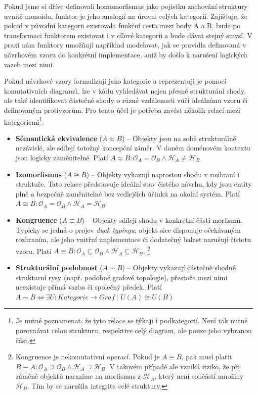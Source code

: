 \documentclass[FM,DP,fonts]{tulthesis}
\begin{document}
Pokud jsme si dříve definovali homomorfismus jako pojistku zachování struktury uvnitř monoidu, funktor je jeho analogií na úrovni celých kategorií. Zajišťuje, že pokud v původní kategorii existovala funkční cesta mezi body A a B, bude po transformaci funktorem existovat i v cílové kategorii a bude dávat stejný smysl. V praxi nám funktory umožňují například modelovat, jak se pravidla definovaná v návrhovém vzoru do konkrétní implementace, aniž by došlo k narušení logických vazeb mezi nimi.

Pokud návrhové vzory formalizuji jako kategorie a reprezentuji je pomocí komutativních diagramů, lze v kódu vyhledávat nejen přesné strukturání shody, ale také identifikovat částečné shody o různé vzdálenosti vůči ideálnímu vzoru či definovaným protivzorům. Pro tento účel je potřeba zavést několik relací mezi kategoriemi\footnote{Je nutné poznamenat, že tyto relace se týkají i podkategorií. Není tak nutné porovnávat celou strukturu, respektive celý diagram, ale pouze jeho  vybranou část.}:
\begin{itemize}
	\item \textbf{Sémantická ekvivalence} ($A \approx B$) – Objekty jsou na sobě strukturálně nezávislé, ale sdílejí totožný koncepční záměr. V daném doménovém kontextu jsou logicky zaměnitelné. Platí $A \approx B: \mathcal{O}_A = \mathcal{O}_B \land \mathcal{H}_A \not= \mathcal{H}_B$

	\item \textbf{Izomorfismus} ($A \cong B$) – Objekty vykazují naprostou shodu v rozhraní i struktuře. Tato relace představuje ideální stav čistého návrhu, kdy jsou entity plně a bezpečně zaměnitelné bez vedlejších účinků na okolní systém. Platí $A \cong B: \mathcal{O}_A = \mathcal{O}_B \land \mathcal{H}_A = \mathcal{H}_B$

	\item \textbf{Kongruence} ($A \equiv B$) – Objekty sdílejí shodu v konkrétní části morfismů. Typicky se jedná o projev \textit{duck typingu}; objekt sice disponuje očekávaným rozhraním, ale jeho vnitřní implementace či dodatečný balast narušují čistotu vzoru. Platí $A \equiv B: \mathcal{O}_A \subseteq \mathcal{O}_B \land \mathcal{H}_A \subseteq \mathcal{H}_B$. \footnote{Kongruence je nekomutativní operací. Pokud je $A\equiv B$, pak musí platit $B \equiv A: \mathcal{O}_A \supseteq \mathcal{O}_B \land \mathcal{H}_A \supseteq \mathcal{H}_B$. V takovém případě ale vzniká riziko, že při záměně objektů narazíme na morfismus z $\mathcal{H}_A$, který není součástí množiny $\mathcal{H}_B$. Tím by se narušila integrita celé struktury.}

	\item \textbf{Strukturální podobnost} ($A \sim B$) – Objekty vykazují částečně shodné strukturní rysy (např. podobné grafové topologie), přestože mezi nimi neexistuje přímá vazba či společný předek. Platí $A \sim B \iff \exists U: Kategorie \to Graf \mid U(A) \cong U(B)$
\end{itemize}
\end{document}
